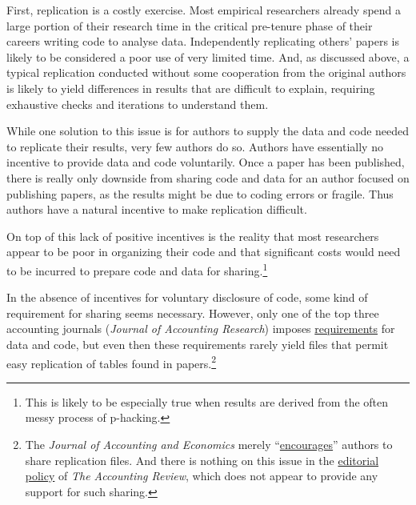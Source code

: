 \documentclass[
  letterpaper,
  DIV=11,
  numbers=noendperiod]{scrartcl}
\begin{document}
First, replication is a costly exercise. Most empirical researchers
already spend a large portion of their research time in the critical
pre-tenure phase of their careers writing code to analyse data.
Independently replicating others' papers is likely to be considered a
poor use of very limited time. And, as discussed above, a typical
replication conducted without some cooperation from the original authors
is likely to yield differences in results that are difficult to explain,
requiring exhaustive checks and iterations to understand them.

While one solution to this issue is for authors to supply the data and
code needed to replicate their results, very few authors do so. Authors
have essentially no incentive to provide data and code voluntarily. Once
a paper has been published, there is really only downside from sharing
code and data for an author focused on publishing papers, as the results
might be due to coding errors or fragile. Thus authors have a natural
incentive to make replication difficult.

On top of this lack of positive incentives is the reality that most
researchers appear to be poor in organizing their code and that
significant costs would need to be incurred to prepare code and data for
sharing.\footnote{This is likely to be especially true when results are
  derived from the often messy process of p-hacking.}

In the absence of incentives for voluntary disclosure of code, some kind
of requirement for sharing seems necessary. However, only one of the top
three accounting journals (\emph{Journal of Accounting Research})
imposes
\href{https://onlinelibrary.wiley.com/page/journal/1475679x/homepage/ForAuthors.html}{requirements}
for data and code, but even then these requirements rarely yield files
that permit easy replication of tables found in papers.\footnote{The
  \emph{Journal of Accounting and Economics} merely
  ``\href{https://www.elsevier.com/journals/journal-of-accounting-and-economics/0165-4101/guide-for-authors}{encourages}''
  authors to share replication files. And there is nothing on this issue
  in the
  \href{https://meridian.allenpress.com/DocumentLibrary/AAAN/TAR_Editorial_Policy.pdf}{editorial
  policy} of \emph{The Accounting Review}, which does not appear to
  provide any support for such sharing.}
\end{document}
